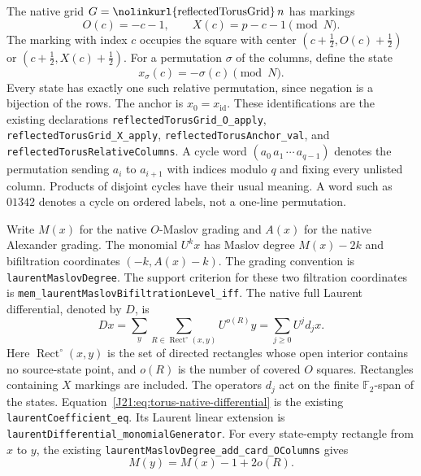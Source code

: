 \documentclass[11pt,oneside]{report}
\theoremstyle{definition}
\numberwithin{equation}{section}
\newcommand{\F}{\mathbb F_2}
\newcommand{\decl}[1]{\textnormal{\nolinkurl{#1}}}
\begin{document}
The native grid $G=\decl{reflectedTorusGrid}\,n$ has markings
\begin{equation}
              O(c)=-c-1,\qquad X(c)=p-c-1\pmod N.
\label{J21:eq:torus-native-markings}
\end{equation}
The marking with index $c$ occupies the square with center
$(c+\tfrac12,O(c)+\tfrac12)$ or $(c+\tfrac12,X(c)+\tfrac12)$.
For a permutation $\sigma$ of the columns, define the state
\[
                         x_\sigma(c)=-\sigma(c)\pmod N.
\]
Every state has exactly one such relative permutation, since negation is
a bijection of the rows. The anchor is $x_0=x_{\mathrm{id}}$.
These identifications are the existing declarations
\decl{reflectedTorusGrid_O_apply}, \decl{reflectedTorusGrid_X_apply},
\decl{reflectedTorusAnchor_val}, and \decl{reflectedTorusRelativeColumns}.
A cycle word $(a_0\,a_1\,\cdots\,a_{q-1})$ denotes the permutation
sending $a_i$ to $a_{i+1}$ with indices modulo $q$ and fixing every
unlisted column. Products of disjoint cycles have their usual meaning.
A word such as $01342$ denotes a cycle on ordered labels, not a one-line
permutation.

Write $M(x)$ for the native $O$-Maslov grading and $A(x)$ for the native
Alexander grading. The monomial $U^k x$ has Maslov degree $M(x)-2k$
and bifiltration coordinates $(-k,A(x)-k)$.
The grading convention is \decl{laurentMaslovDegree}. The support criterion
for these two filtration coordinates is
\decl{mem_laurentMaslovBifiltrationLevel_iff}.
The native full Laurent differential, denoted by $D$, is
\begin{equation}
 D x=\sum_y\sum_{R\in\operatorname{Rect}^{\circ}(x,y)}U^{o(R)}y
     =\sum_{j\geq0}U^j d_jx.
\label{J21:eq:torus-native-differential}
\end{equation}
Here $\operatorname{Rect}^{\circ}(x,y)$ is the set of directed rectangles
whose open interior contains no source-state point, and $o(R)$ is the
number of covered $O$ squares. Rectangles containing $X$ markings are
included. The operators $d_j$ act on the finite $\F$-span of the states.
Equation~\eqref{J21:eq:torus-native-differential} is the existing
\decl{laurentCoefficient_eq}. Its Laurent linear extension is
\decl{laurentDifferential_monomialGenerator}.
For every state-empty rectangle from $x$ to $y$, the existing
\decl{laurentMaslovDegree_add_card_OColumns} gives
\begin{equation}
                         M(y)=M(x)-1+2o(R).
\label{J21:eq:torus-rectangle-degree}
\end{equation}
\end{document}
